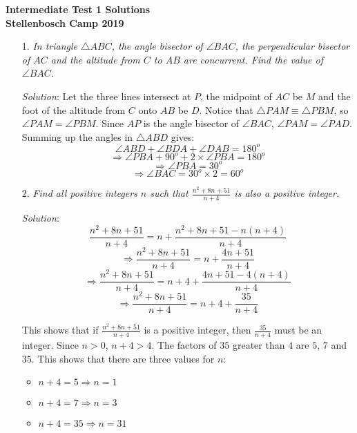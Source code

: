 \documentclass{article}
\begin{document}
\begin{center}
  \textbf{\Large Intermediate Test 1 Solutions}
  \\ \vspace{1em}
  \textbf{\large Stellenbosch Camp 2019}
\end{center}


\begin{enumerate}[1.]

\item[1.] %
\textit{In triangle $\triangle ABC$, the angle bisector of $\angle BAC$, the perpendicular bisector of $AC$ and the altitude from $C$ to $AB$ are concurrent. Find the value of $\angle BAC$.}

\textit{Solution}:
Let the three lines intersect at $P$, the midpoint of $AC$ be $M$ and the foot of the altitude from $C$ onto $AB$ be $D$. Notice that $\triangle PAM \equiv \triangle PBM$, so $\angle PAM = \angle PBM$. Since $AP$ is the angle bisector of $\angle BAC$, $\angle PAM = \angle PAD$. Summing up the angles in $\triangle ABD$ gives:
$$\angle ABD + \angle BDA + \angle DAB = 180^o$$ 
$$\Rightarrow \angle PBA + 90^o + 2 \times \angle PBA = 180^o$$
$$\Rightarrow \angle PBA = 30^o$$
$$\Rightarrow \angle BAC = 30^o \times 2 = 60^o$$
\vspace{6.81mm}

\item[2.] %
\textit{Find all positive integers $n$ such that $\frac{n^2 + 8n + 51}{n + 4}$ is also a positive integer.}

\textit{Solution}:
$$\frac{n^2 + 8n + 51}{n + 4} = n + \frac{n^2 + 8n + 51 - n(n + 4)}{n + 4}$$
$$\Rightarrow \frac{n^2 + 8n + 51}{n + 4} = n + \frac{4n + 51}{n + 4}$$
$$\Rightarrow \frac{n^2 + 8n + 51}{n + 4} = n + 4 + \frac{4n + 51 - 4(n + 4)}{n + 4}$$
$$\Rightarrow \frac{n^2 + 8n + 51}{n + 4} = n + 4 + \frac{35}{n + 4}$$

This shows that if $\frac{n^2 + 8n + 51}{n + 4}$ is a positive integer, then $\frac{35}{n + 4}$ must be an integer. Since $n > 0$, $n + 4 > 4$.
The factors of $35$ greater than $4$ are $5$, $7$ and $35$. This shows that there are three values for $n$:
\begin{itemize}
    \item $n + 4 = 5 \Rightarrow n = 1$
    \item $n + 4 = 7 \Rightarrow n = 3$
    \item $n + 4 = 35 \Rightarrow n = 31$
\end{itemize}


\end{enumerate}
\end{document}
